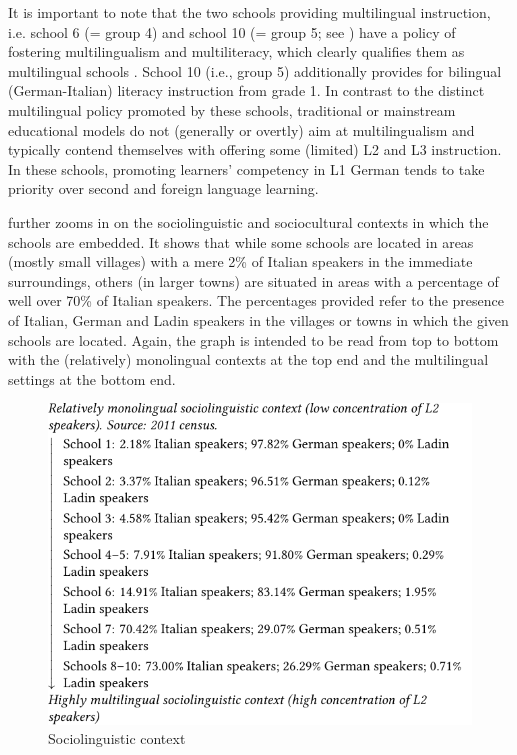 \documentclass[output=paper]{../langscibook}
\begin{document}
It is important to note that the two schools providing multilingual instruction, i.e. school 6 (= group 4) and school 10 (= group 5; see ) have a policy of fostering multilingualism and multiliteracy, which clearly qualifies them as multilingual schools \citep[32]{Cenoz2009}. School 10 (i.e., group 5) additionally provides for bilingual (German-Italian) literacy instruction from grade 1. In contrast to the distinct multilingual policy promoted by these schools, traditional or mainstream educational models do not (generally or overtly) aim at multilingualism and typically contend themselves with offering some (limited) L2 and L3 instruction. In these schools, promoting learners’ competency in L1 German tends to take priority over second and foreign language learning.

 further zooms in on the sociolinguistic and sociocultural contexts in which the schools are embedded. It shows that while some schools are located in areas (mostly small villages) with a mere 2\% of Italian speakers in the immediate surroundings, others (in larger towns) are situated in areas with a percentage of well over 70\% of Italian speakers. The percentages provided refer to the presence of Italian, German and Ladin speakers in the villages or towns in which the given schools are located. Again, the graph is intended to be read from top to bottom with the (relatively) monolingual contexts at the top end and the multilingual settings at the bottom end.

\begin{figure}[t]
\includegraphics{figures/fig-7-2.pdf}
\caption{Sociolinguistic context\label{fig:7:2}}
\end{figure}
\end{document}
